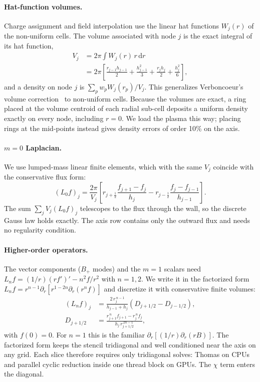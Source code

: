 \documentclass[aps,prab,reprint,floatfix,superscriptaddress,amsmath,amssymb]{revtex4-2}
\newcommand{\dd}{\mathrm{d}}
\begin{document}
\paragraph{Hat-function volumes.} Charge assignment and field interpolation use the linear hat functions $W_j(r)$ of the non-uniform cells. The volume associated with node $j$ is the exact integral of its hat function,
\begin{align}
V_j &= 2\pi\!\int W_j(r)\,r\,\dd r \nonumber\\
    &= 2\pi\left[\frac{r_{j-1}h_{j-1}}{2} + \frac{h_{j-1}^2}{3} + \frac{r_j h_j}{2} + \frac{h_j^2}{6}\right], \label{eq:vol}
\end{align}
and a density on node $j$ is $\sum_p w_p W_j(r_p)/V_j$. This generalizes Verboncoeur's volume correction~\cite{Verboncoeur2001} to non-uniform cells. Because the volumes are exact, a ring placed at the volume centroid of each radial sub-cell deposits a uniform density exactly on every node, including $r=0$. We load the plasma this way; placing rings at the mid-points instead gives density errors of order 10\% on the axis.

\paragraph{$m=0$ Laplacian.} We use lumped-mass linear finite elements, which with the same $V_j$ coincide with the conservative flux form:
\begin{equation}
(L_0 f)_j = \frac{2\pi}{V_j}\left[r_{j+\frac12}\frac{f_{j+1}-f_j}{h_j} - r_{j-\frac12}\frac{f_j - f_{j-1}}{h_{j-1}}\right]. \label{eq:L0}
\end{equation}
The sum $\sum_j V_j (L_0 f)_j$ telescopes to the flux through the wall, so the discrete Gauss law holds exactly. The axis row contains only the outward flux and needs no regularity condition.

\paragraph{Higher-order operators.} The vector components ($B_+$ modes) and the $m=1$ scalars need $L_n f = (1/r)(r f')' - n^2 f/r^2$ with $n = 1, 2$. We write it in the factorized form $L_n f = r^{n-1}\partial_r\!\left[r^{1-2n}\partial_r(r^n f)\right]$ and discretize it with conservative finite volumes:
\begin{align}
(L_n f)_j &= \frac{2\,r_j^{\,n-1}}{h_{j-1}+h_j}\left(D_{j+1/2} - D_{j-1/2}\right), \label{eq:Ln}\\
D_{j+1/2} &= \frac{r_{j+1}^{\,n} f_{j+1} - r_j^{\,n} f_j}{h_j\, r_{j+1/2}^{\,2n-1}}, \nonumber
\end{align}
with $f(0)=0$. For $n=1$ this is the familiar $\partial_r[(1/r)\partial_r(rB)]$. The factorized form keeps the stencil tridiagonal and well conditioned near the axis on any grid. Each slice therefore requires only tridiagonal solves: Thomas on CPUs and parallel cyclic reduction inside one thread block on GPUs. The $\chi$ term enters the diagonal.
\end{document}
